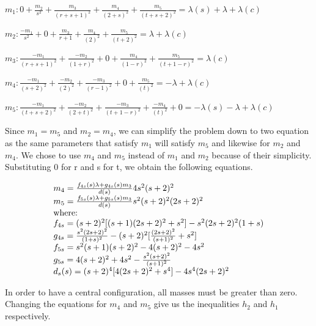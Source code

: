 \documentclass[11pt,leqno]{article}
\theoremstyle{definition}
\theoremstyle{remark}
\numberwithin{equation}{section}
\begin{document}
$m_{1}: 0 + \frac{m_2}{s^2} + \frac{m_3}{(r+s+1)^2} +\frac{m_4}{(2+s)^2} + \frac{m_5}{(t+s+2)^2} =\lambda(s)+\lambda+\lambda(c)$

$m_{2}: \frac{-m_1}{s^2} + 0 + \frac{m_3}{r+1} +\frac{m_4}{(2)^2} + \frac{m_5}{(t+2)^2} =\lambda+\lambda(c)$

$m_{3}: \frac{-m_1}{(r+s+1)^2} + \frac{-m_2}{(1+r)^2} + 0 +\frac{m_4}{(1-r)^2} + \frac{m_5}{(t+1-r)^2} =\lambda(c)$

$m_{4}: \frac{-m_1}{(s+2)^2} + \frac{-m_2}{(2)^2} +\frac{-m_3}{(r-1)^2} + 0 + \frac{m_5}{(t)^2} =-\lambda+\lambda(c)$

$m_{5}: \frac{-m_1}{(t+s+2)^2} + \frac{-m_2}{(2+t)^2} +\frac{-m_3}{(t+1-r)^2} + \frac{-m_4}{(t)^2} + 0 =-\lambda(s)-\lambda+\lambda(c)$



\hspace{6cm}


\newline Since $m_1=m_5$ and $m_2=m_4$, we can simplify the problem down to two equation as the same parameters that satisfy $m_1$ will satisfy $m_5$ and likewise for $m_2$ and $m_4$. We chose to use $m_4$ and $m_5$ instead of $m_1$ and $m_2$ because of their simplicity. Substituting 0 for r and s for t, we obtain the following equations.



\begin{equation} \begin{array}{l}
m_{4}=\frac{f_{4s}(s)\lambda+g_{4s}(s)m_{3}}{d(s)}4s^{2}(s+2)^{2} \\
m_{5}=\frac{f_{5s}(s)\lambda+g_{5s}(s)m_{3}}{d(s)}s^{2}(s+2)^{2}(2s+2)^{2} \\
$where:$\\
f_{4s}=(s+2)^{2}[(s+1)(2s+2)^{2}+s^{2}]-s^{2}(2s+2)^{2}(1+s) \\
g_{4s}=\frac{s^{2}(2s+2)^{2}}{(1+s)^{2}}-(s+2)^{2}[\frac{(2s+2)^{2}}{(s+1)^{2}}+s^{2}] \\
f_{5s}=s^{2}(s+1)(s+2)^{2}-4(s+2)^{2}-4s^{2} \\
g_{5s}=4(s+2)^{2}+4s^{2}-\frac{s^{2}(s+2)^{2}}{(s+1)^{2}} \\
d_s(s)=(s+2)^{4}[4(2s+2)^{2}+s^{4}]-4s^{4}(2s+2)^{2}
\end{array}
\end{equation}

In order to have a central configuration, all masses must be greater than zero. Changing the equations for $m_4$ and $m_5$ give us the inequalities $h_2$ and $h_1$ respectively.  
\end{document}

